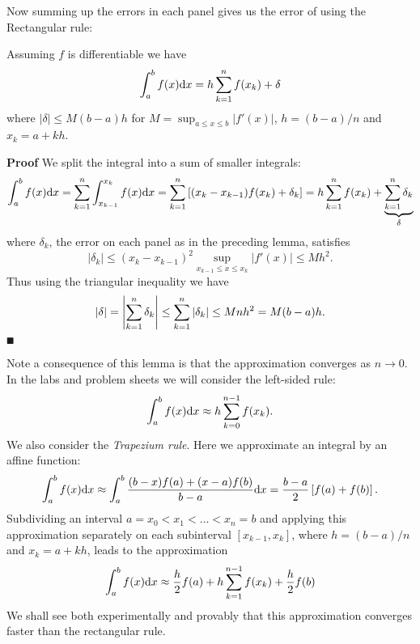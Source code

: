 Now summing up the errors in each panel gives us the error of using the Rectangular rule:

\begin{theorem} Assuming $f$ is differentiable we have
\[
\ensuremath{\int}_a^b f(x) {\rm d}x =  h \ensuremath{\sum}_{k=1}^n f(x_k) +  \ensuremath{\delta}
\]
where $|\ensuremath{\delta}| \ensuremath{\leq} M (b-a) h$ for $M = \sup_{a \ensuremath{\leq} x \ensuremath{\leq} b}|f'(x)|$, $h = (b-a)/n$ and $x_k = a + kh$. 

\end{theorem}
\textbf{Proof} We split the integral into a sum of smaller integrals:
\[
\ensuremath{\int}_a^b f(x) {\rm d}x = \ensuremath{\sum}_{k=1}^n  \ensuremath{\int}_{x_{k-1}}^{x_k} f(x) {\rm d}x =
\ensuremath{\sum}_{k=1}^n  \br[(x_k - x_{k-1}) f(x_k) + \ensuremath{\delta}_k] =  h \ensuremath{\sum}_{k=1}^n f(x_k) +  \underbrace{\ensuremath{\sum}_{k=1}^n \ensuremath{\delta}_k}_\ensuremath{\delta}
\]
where $\ensuremath{\delta}_k$, the error on each panel as in the preceding lemma, satisfies 
\[
|\ensuremath{\delta}_k| \ensuremath{\leq} (x_k-x_{k-1})^2 \sup_{x_{k-1} \ensuremath{\leq} x \ensuremath{\leq} x_k}|f'(x)| \ensuremath{\leq} M h^2.
\]
Thus using the triangular inequality we have 
\[
|\delta| = \left|{ \sum_{k=1}^n \delta_k}\right| \leq \sum_{k=1}^n |\delta_k| \leq M n h^2 = M(b-a)h.
\]
\ensuremath{\QED}

Note a consequence of this lemma is that the approximation converges as $n \ensuremath{\rightarrow} 0$. In the labs and problem sheets we will consider the left-sided rule:
\[
\ensuremath{\int}_a^b f(x) {\rm d}x \ensuremath{\approx}  h \ensuremath{\sum}_{k=0}^{n-1} f(x_k).
\]
We also consider the \emph{Trapezium rule}. Here we approximate an integral  by an affine function:
\[
\ensuremath{\int}_a^b f(x) {\rm d} x \ensuremath{\approx} \ensuremath{\int}_a^b {(b-x)f(a) + (x-a)f(b) \over b-a} \dx
= {b-a \over 2} \br[f(a) + f(b)].
\]
Subdividing an interval $a = x_0 < x_1 < \ensuremath{\ldots} < x_n = b$ and applying this approximation separately on each subinterval $[x_{k-1},x_k]$, where $h = (b-a)/n$ and $x_k = a + kh$, leads to the approximation
\[
\ensuremath{\int}_a^b f(x) {\rm d}x \ensuremath{\approx}  {h \over 2} f(a) + h \ensuremath{\sum}_{k=1}^{n-1} f(x_k) + {h \over 2} f(b)
\]
We shall see both experimentally and provably that this approximation converges faster than the rectangular rule.



